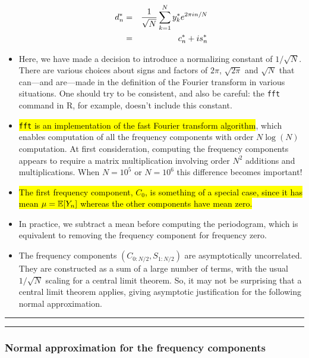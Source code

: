 \documentclass[]{article}
\begin{document}
\begin{itemize}
  \begin{eqnarray}
  d_n^* &=& \frac{1}{\sqrt{N}} \sum_{k=1}^N y_k^* e^{2\pi i n/N}
  \\
  &=&c_n^* + is_n^*
  \end{eqnarray}
\item
  Here, we have made a decision to introduce a normalizing constant of
  \(1/\sqrt{N}\). There are various choices about signs and factors of
  \(2\pi\), \(\sqrt{2\pi}\) and \(\sqrt{N}\) that can---and are---made
  in the definition of the Fourier transform in various situations. One
  should try to be consistent, and also be careful: the \texttt{fft}
  command in R, for example, doesn't include this constant.
\item
  \hl{\texttt{fft} is an implementation of the fast Fourier transform
  algorithm}, which enables computation of all the frequency components
  with order \(N\log(N)\) computation. At first consideration, computing
  the frequency components appears to require a matrix multiplication
  involving order \(N^2\) additions and multiplications. When \(N=10^5\)
  or \(N=10^6\) this difference becomes important!
\item
  \hl{The first frequency component, $C_0$, is something of a special
  case, since it has mean $\mu=\mathbb{E}[Y_n]$ whereas the other components
  have mean zero.}
\item
  In practice, we subtract a mean before computing the periodogram,
  which is equivalent to removing the frequency component for frequency
  zero.
\item
  The frequency components \((C_{0:N/2},S_{1:N/2})\) are asymptotically
  uncorrelated. They are constructed as a sum of a large number of
  terms, with the usual \(1/\sqrt{N}\) scaling for a central limit
  theorem. So, it may not be surprising that a central limit theorem
  applies, giving asymptotic justification for the following normal
  approximation.
\end{itemize}

\begin{center}\rule{0.5\linewidth}{\linethickness}\end{center}

\begin{center}\rule{0.5\linewidth}{\linethickness}\end{center}

\subsubsection{Normal approximation for the frequency
components}\label{normal-approximation-for-the-frequency-components}
\end{document}
